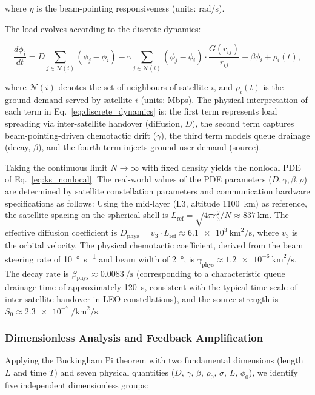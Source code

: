 \documentclass[sn-nature,pdflatex]{sn-jnl}
\begin{document}
where $\eta$ is the beam-pointing responsiveness (units: rad/s).

The load evolves according to the discrete dynamics:

\begin{equation}
\label{eq:discrete_dynamics}
\frac{d\phi_i}{dt} = D \sum_{j \in \mathcal{N}(i)} (\phi_j - \phi_i) - \gamma \sum_{j \in \mathcal{N}(i)} (\phi_j - \phi_i) \cdot \frac{G(r_{ij})}{r_{ij}} - \beta \phi_i + \rho_i(t),
\end{equation}

where $\mathcal{N}(i)$ denotes the set of neighbours of satellite $i$, and $\rho_i(t)$ is the ground demand served by satellite $i$ (units: Mbps). The physical interpretation of each term in Eq.~\eqref{eq:discrete_dynamics} is: the first term represents load spreading via inter-satellite handover (diffusion, $D$), the second term captures beam-pointing-driven chemotactic drift ($\gamma$), the third term models queue drainage (decay, $\beta$), and the fourth term injects ground user demand (source).

Taking the continuous limit $N \to \infty$ with fixed density yields the nonlocal PDE of Eq.~\eqref{eq:ks_nonlocal}.
The real-world values of the PDE parameters ($D, \gamma, \beta, \rho$) are determined by satellite constellation parameters and communication hardware specifications as follows:
Using the mid-layer (L3, altitude \SI{1100}{\km}) as reference, the satellite spacing on the spherical shell is $L_{\text{ref}} = \sqrt{4\pi r_3^2 / N} \approx \SI{837}{\km}$.
The effective diffusion coefficient is $D_{\text{phys}} = v_3 \cdot L_{\text{ref}} \approx \SI{6.1e3}{\km\squared\per\second}$, where $v_3$ is the orbital velocity.
The physical chemotactic coefficient, derived from the beam steering rate of \SI{10}{\degree\per\second} and beam width of \SI{2}{\degree}, is $\gamma_{\text{phys}} \approx \num{1.2e-6}~\si{\km\squared\per\second}$.
The decay rate is $\beta_{\text{phys}} \approx \SI{0.0083}{\per\second}$ (corresponding to a characteristic queue drainage time of approximately 120~s, consistent with the typical time scale of inter-satellite handover in LEO constellations), and the source strength is $S_0 \approx \SI{2.3e-7}{\per\km\squared\per\second}$.

\subsubsection{Dimensionless Analysis and Feedback Amplification}

Applying the Buckingham Pi theorem with two fundamental dimensions (length $L$ and time $T$) and seven physical quantities ($D$, $\gamma$, $\beta$, $\rho_0$, $\sigma$, $L$, $\phi_0$), we identify five independent dimensionless groups:
\end{document}
